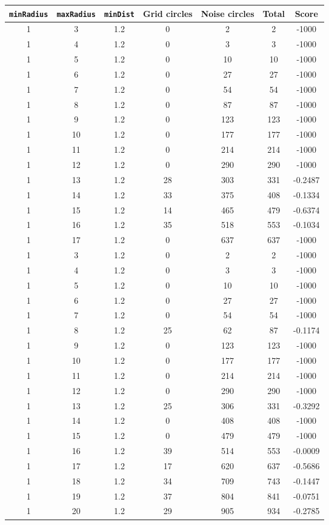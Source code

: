 \documentclass[letterpaper, 12pt]{article}
\begin{document}
\begin{longtable}{|c|c|c|c|c|c|c|}
\hline
\textbf{\texttt{minRadius}} & \textbf{\texttt{maxRadius}} & \textbf{\texttt{minDist}} & \textbf{Grid circles} & \textbf{Noise circles} & \textbf{Total} & \textbf{Score} \\
\hline
1 & 3 & 1.2 & 0 & 2 & 2 & -1000 \\
\hline
1 & 4 & 1.2 & 0 & 3 & 3 & -1000 \\
\hline
1 & 5 & 1.2 & 0 & 10 & 10 & -1000 \\
\hline
1 & 6 & 1.2 & 0 & 27 & 27 & -1000 \\
\hline
1 & 7 & 1.2 & 0 & 54 & 54 & -1000 \\
\hline
1 & 8 & 1.2 & 0 & 87 & 87 & -1000 \\
\hline
1 & 9 & 1.2 & 0 & 123 & 123 & -1000 \\
\hline
1 & 10 & 1.2 & 0 & 177 & 177 & -1000 \\
\hline
1 & 11 & 1.2 & 0 & 214 & 214 & -1000 \\
\hline
1 & 12 & 1.2 & 0 & 290 & 290 & -1000 \\
\hline
1 & 13 & 1.2 & 28 & 303 & 331 & -0.2487 \\
\hline
1 & 14 & 1.2 & 33 & 375 & 408 & -0.1334 \\
\hline
1 & 15 & 1.2 & 14 & 465 & 479 & -0.6374 \\
\hline
1 & 16 & 1.2 & 35 & 518 & 553 & -0.1034 \\
\hline
1 & 17 & 1.2 & 0 & 637 & 637 & -1000 \\
\hline
1 & 3 & 1.2 & 0 & 2 & 2 & -1000 \\
\hline
1 & 4 & 1.2 & 0 & 3 & 3 & -1000 \\
\hline
1 & 5 & 1.2 & 0 & 10 & 10 & -1000 \\
\hline
1 & 6 & 1.2 & 0 & 27 & 27 & -1000 \\
\hline
1 & 7 & 1.2 & 0 & 54 & 54 & -1000 \\
\hline
1 & 8 & 1.2 & 25 & 62 & 87 & -0.1174 \\
\hline
1 & 9 & 1.2 & 0 & 123 & 123 & -1000 \\
\hline
1 & 10 & 1.2 & 0 & 177 & 177 & -1000 \\
\hline
1 & 11 & 1.2 & 0 & 214 & 214 & -1000 \\
\hline
1 & 12 & 1.2 & 0 & 290 & 290 & -1000 \\
\hline
1 & 13 & 1.2 & 25 & 306 & 331 & -0.3292 \\
\hline
1 & 14 & 1.2 & 0 & 408 & 408 & -1000 \\
\hline
1 & 15 & 1.2 & 0 & 479 & 479 & -1000 \\
\hline
1 & 16 & 1.2 & 39 & 514 & 553 & -0.0009 \\
\hline
1 & 17 & 1.2 & 17 & 620 & 637 & -0.5686 \\
\hline
1 & 18 & 1.2 & 34 & 709 & 743 & -0.1447 \\
\hline
1 & 19 & 1.2 & 37 & 804 & 841 & -0.0751 \\
\hline
1 & 20 & 1.2 & 29 & 905 & 934 & -0.2785 \\
\hline
\end{longtable}
\end{document}
